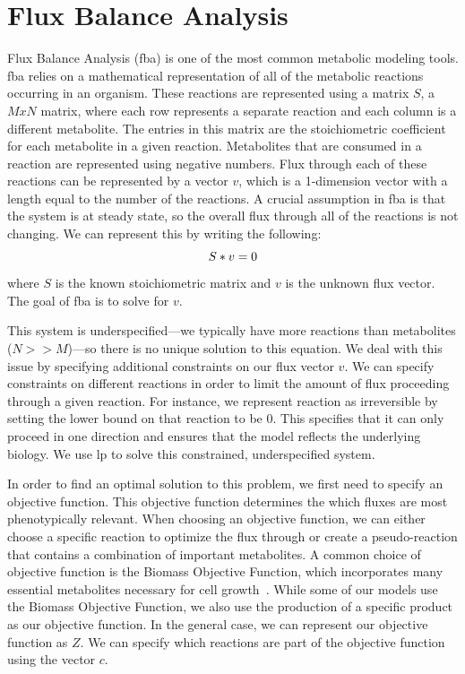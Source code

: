 \section{Flux Balance Analysis}
Flux Balance Analysis (\gls{fba}) is one of the most common metabolic modeling tools.
\gls{fba} relies on a mathematical representation of all of the metabolic reactions occurring in an organism.
These reactions are represented using a matrix $S$, a $M x N$ matrix, where each row represents a separate reaction and each column is a different metabolite.
The entries in this matrix are the stoichiometric coefficient for each metabolite in a given reaction.
Metabolites that are consumed in a reaction are represented using negative numbers.
Flux through each of these reactions can be represented by a vector $v$, which is a 1-dimension vector with a length equal to the number of the reactions.
A crucial assumption in \gls{fba} is that the system is at steady state, so the overall flux through all of the reactions is not changing.
We can represent this by writing the following:
\begin{equation}
S * v = 0 \\
\end{equation}
where $S$ is the known stoichiometric matrix and $v$ is the unknown flux vector.
The goal of \gls{fba} is to solve for $v$.

This system is underspecified---we typically have more reactions than metabolites ($N >> M$)---so there is no unique solution to this equation.
We deal with this issue by specifying additional constraints on our flux vector $v$.
We can specify constraints on different reactions in order to limit the amount of flux proceeding through a given reaction.
For instance, we represent reaction as irreversible by setting the lower bound on that reaction to be 0.
This specifies that it can only proceed in one direction and ensures that the model reflects the underlying biology.
We use \gls{lp} to solve this constrained, underspecified system. 

In order to find an optimal solution to this problem, we first need to specify an objective function.
This objective function determines the which fluxes are most phenotypically relevant.
When choosing an objective function, we can either choose a specific reaction to optimize the flux through or create a pseudo-reaction that contains a combination of important metabolites.
A common choice of objective function is the Biomass Objective Function, which incorporates many essential metabolites necessary for cell growth~\cite{feist2010biomass}.
While some of our models use the Biomass Objective Function, we also use the production of a specific product as our objective function.
In the general case, we can represent our objective function as $Z$.
We can specify which reactions are part of the objective function using the vector $c$.

